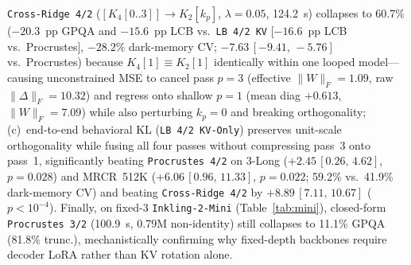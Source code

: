 \documentclass[11pt]{article}
\newcommand{\ci}[2]{\,{\scriptsize\ensuremath{[#1,\,#2]}}}
\begin{document}
\begin{enumerate}
\texttt{Cross-Ridge~4/2} ($[K_4[0..3]]\to K_2[k_p]$, $\lambda{=}0.05$, 124.2~s) collapses to 60.7\% ($-20.3$~pp GPQA and
$-15.6$~pp LCB vs.\ \texttt{LB~4/2~KV} [$-16.6$~pp LCB vs.\ Procrustes], $-28.2\%$ dark-memory CV;
$-7.63$\ci{-9.41}{-5.76} vs.\ Procrustes) because $K_4[1]\equiv K_2[1]$ identically within one looped model---causing
unconstrained MSE to cancel pass $p{=}3$ (effective $\|W\|_F{=}1.09$, raw $\|\Delta\|_F{=}10.32$) and regress onto
shallow $p{=}1$ (mean diag $+0.613$, $\|W\|_F{=}7.09$) while also perturbing $k_p{=}0$ and breaking orthogonality;
(c)~end-to-end behavioral KL (\texttt{LB~4/2~KV-Only}) preserves unit-scale orthogonality while fusing all four passes
without compressing pass~3 onto pass~1, significantly beating \texttt{Procrustes~4/2} on 3-Long
($+2.45$\ci{0.26}{4.62}, $p{=}0.028$) and MRCR~512K ($+6.06$\ci{0.96}{11.33}, $p{=}0.022$; 59.2\% vs.\ 41.9\%
dark-memory CV) and beating \texttt{Cross-Ridge~4/2} by $+8.89$\ci{7.11}{10.67} ($p{<}10^{-4}$). Finally, on fixed-3
\texttt{Inkling-2-Mini} (Table~\ref{tab:mini}), closed-form \texttt{Procrustes~3/2} (100.9~s, 0.79M non-identity) still
collapses to 11.1\% GPQA (81.8\% trunc.), mechanistically confirming why fixed-depth backbones require decoder LoRA rather than KV
rotation alone.
\end{enumerate}
\end{document}
